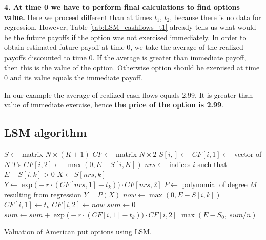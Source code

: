 \documentclass[a4paper,11pt, twoside]{book}
\theoremstyle{definition}
\theoremstyle{remark}
\newcounter{example}[chapter]
\begin{document}
\noindent \textbf{4. At time 0 we have to perform final calculations to find options value.} Here we proceed different than at times $t_1$, $t_2$, because there is no data for regression. However, Table \ref{tab:LSM_cashflows_t1} already tells us what would be the future payoffs if the option was not exercised immediately. In order to obtain estimated future payoff at time 0, we take the average of the realized payoffs discounted to time 0. If the average is greater than immediate payoff, then this is the value of the option. Otherwise option should be exercised at time 0 and its value equals the immediate payoff.

In our example the average of realized cash flows equals 2.99. It is greater than value of immediate exercise, hence \textbf{the price of the option is 2.99}.

\FloatBarrier
\subsection{LSM algorithm}
\begin{algorithm}
 \begin{algorithmic}[1]
    \State $S \gets$ matrix $N \times (K+1)$ 
    \State $CF \gets$ matrix $N \times 2$ 
     
      \State $S[i,] \gets$  
      \State $CF[i,1] \gets$ vector of $N$ $T$'s 
      \State $CF[i,2] \gets$ $\max(0, E - S[i,K])$ 
    \EndFor
      \State $nrs \gets $ indices $i$ such that $E - S[i,k] > 0$
      \State $X \gets S[nrs, k]$
      \State $Y \gets \exp\bigl(-r\cdot(CF[nrs, 1]-t_k) \bigr)\cdot CF[nrs, 2]$
      \State $P \gets $ polynomial of degree $M$ resulting from regression $Y = P(X)$
	\State $now \gets \max(0, E - S[i,k])$
	  \State $CF[i,1] \gets t_k$ 
	  \State $CF[i,2] \gets now$ 
	\EndIf
      \EndFor
    \EndFor
    \State $sum \gets 0$
      \State $sum \gets sum + \exp\bigl(-r\cdot(CF[i, 1]-t_k) \bigr)\cdot CF[i, 2]$
    \EndFor
    \State \Return $\max(E - S_0,\ sum/n)$
    \EndFunction 
 \end{algorithmic}
 \caption{Valuation of American put options using LSM.}
 \label{alg:LSM}
\end{algorithm}
\end{document}
